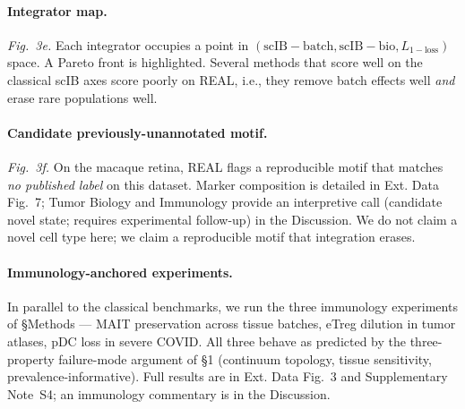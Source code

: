 \paragraph{Integrator map.} \emph{Fig.~3e.}  Each integrator occupies a point in $(\mathrm{scIB-batch}, \mathrm{scIB-bio}, L_{1-\text{loss}})$ space.  A Pareto front is highlighted.  Several methods that score well on the classical scIB axes score poorly on REAL, i.e., they remove batch effects well \emph{and} erase rare populations well.

\paragraph{Candidate previously-unannotated motif.} \emph{Fig.~3f.}  On the macaque retina, REAL flags a reproducible motif that matches \emph{no published label} on this dataset.  Marker composition is detailed in Ext. Data Fig.~7; Tumor Biology and Immunology provide an interpretive call (candidate novel state; requires experimental follow-up) in the Discussion.  We do not claim a novel cell type here; we claim a reproducible motif that integration erases.

\paragraph{Immunology-anchored experiments.} In parallel to the classical benchmarks, we run the three immunology experiments of \S Methods --- MAIT preservation across tissue batches, eTreg dilution in tumor atlases, pDC loss in severe COVID.  All three behave as predicted by the three-property failure-mode argument of \S1 (continuum topology, tissue sensitivity, prevalence-informative).  Full results are in Ext. Data Fig.~3 and Supplementary Note~S4; an immunology commentary is in the Discussion.
